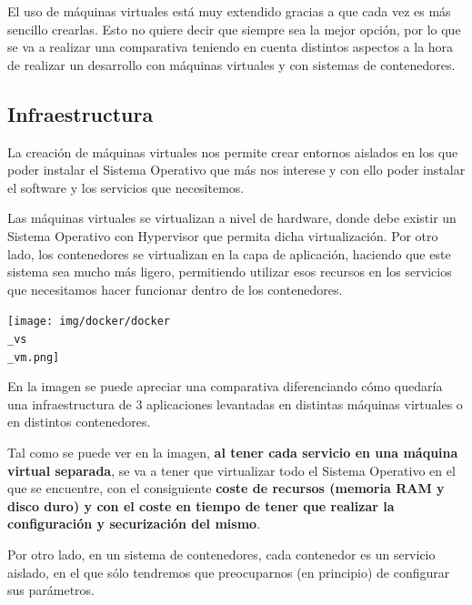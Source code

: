 El uso de máquinas virtuales está muy extendido gracias a que cada vez es más sencillo crearlas. Esto no quiere decir que siempre sea la mejor opción, por lo que  se va a realizar una comparativa teniendo en cuenta distintos aspectos a la hora de realizar un desarrollo con máquinas virtuales y con sistemas de contenedores.


\subsection{Infraestructura}

La creación de máquinas virtuales nos permite crear entornos aislados en los que poder instalar el Sistema Operativo que más nos interese y con ello poder instalar el software y los servicios que necesitemos.

Las máquinas virtuales se virtualizan a nivel de hardware, donde debe existir un Sistema Operativo con Hypervisor que permita dicha virtualización. Por otro lado, los contenedores se virtualizan en la capa de aplicación, haciendo que este sistema sea mucho más ligero, permitiendo utilizar esos recursos en los servicios que necesitamos hacer funcionar dentro de los contenedores.

\vspace{-15pt}
\begin{center}
    \texttt{[image: img/docker/docker\\\_vs\\\_vm.png]}
\end{center}
\vspace{-15pt}


En la imagen se puede apreciar una comparativa diferenciando cómo quedaría una infraestructura de 3 aplicaciones levantadas en distintas máquinas virtuales o en distintos contenedores.

Tal como se puede ver en la imagen, \textbf{al tener cada servicio en una máquina virtual separada}, se va a tener que virtualizar todo el Sistema Operativo en el que se encuentre, con el consiguiente \textbf{coste de recursos (memoria RAM y disco duro) y con el coste en tiempo de tener que realizar la configuración y securización del mismo}.


Por otro lado, en un sistema de contenedores, cada contenedor es un servicio aislado, en el que sólo tendremos que preocuparnos (en principio) de configurar sus parámetros.


